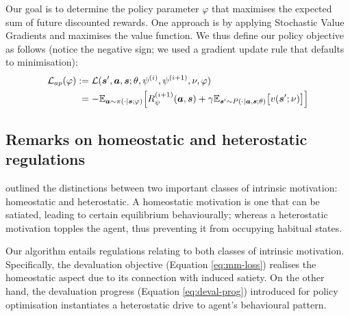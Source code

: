 \documentclass[utf8]{frontiersSCNS}
\newcommand{\bs}{\boldsymbol}
\begin{document}
Our goal is to determine the policy parameter $\varphi$ that maximises the expected sum of future discounted rewards. One approach is by applying Stochastic Value Gradients \citep{svg} and maximises the value function. We thus define our policy objective as follows (notice the negative sign; we used a gradient update rule that defaults to minimisation):
%
	\begin{equation}
	\begin{aligned} \label{eq:policy-loss}
	\mathcal{L}_{ap}(\varphi) 
		&:=
		\mathcal{L}(\bs{s}^\prime, \bs{a}, \bs{s}; \theta, \psi^{(i)}, \psi^{(i+1)}, \nu, \varphi) \\
		&\phantom{:}= - 
		\mathbb{E}_{\bs{a} \sim \pi(\cdot | \bs{s}; \varphi)} 
		\Bigl[ 
		R_\psi^{(i+1)}(\bs{a}, \bs{s}) + \gamma 
		\mathbb{E}_{\bs{s}^\prime \sim P(\cdot |\bs{a}, \bs{s}; \theta)}
		\bigl[ v(\bs{s}^\prime; \nu) \bigr] 
		\Bigr] \\
	\end{aligned}
	\end{equation}

\subsection{Remarks on homeostatic and heterostatic regulations} \label{subsec:homeohetero}

\citet{intrinsicmotiv} outlined the distinctions between two important classes of intrinsic motivation: homeostatic and heterostatic. A homeostatic motivation is one that can be satiated, leading to certain equilibrium behaviourally; whereas a heterostatic motivation topples the agent, thus preventing it from occupying habitual states.

Our algorithm entails regulations relating to both classes of intrinsic motivation. Specifically, the devaluation objective (Equation \ref{eq:mm-loss}) realises the homeostatic aspect due to its connection with induced satiety. On the other hand, the devaluation progress (Equation \ref{eq:deval-prog}) introduced for policy optimisation instantiates a heterostatic drive to agent's behavioural pattern.
\end{document}
